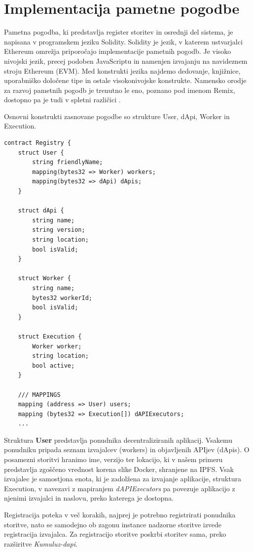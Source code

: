 \documentclass[a4paper, 12pt]{book}
\begin{document}
\section{Implementacija pametne pogodbe}
Pametna pogodba, ki predstavlja register storitev in osrednji del sistema, je napisana v programskem jeziku Solidity.
Solidity je jezik, v katerem ustvarjalci Ethereum omrežja priporočajo implementacije pametnih pogodb.
Je visoko nivojski jezik, precej podoben JavaScriptu in namenjen izvajanju na navideznem stroju Ethereum (EVM).
Med konstrukti jezika najdemo dedovanje, knjižnice, uporabniško določene tipe in ostale visokonivojske konstrukte.
Namensko orodje za razvoj pametnih pogodb je trenutno le eno, poznano pod imenom Remix, dostopno pa je tudi v spletni različici
\cite{solidityDocs}.

Osnovni konstrukti zasnovane pogodbe so strukture User, dApi, Worker in Execution.

\begin{lstlisting}
contract Registry {
	struct User {
		string friendlyName;
		mapping(bytes32 => Worker) workers;
		mapping(bytes32 => dApi) dApis;
	}
	
	struct dApi {
		string name;
		string version;
		string location;
		bool isValid;
	}
	
	struct Worker {
		string name;
		bytes32 workerId;
		bool isValid;
	}
	
	struct Execution {
		Worker worker;
		string location;
		bool active;
	}
	
 	/// MAPPINGS
	mapping (address => User) users;
	mapping (bytes32 => Execution[]) dAPIExecutors;
	...
\end{lstlisting}

Struktura \textbf{User} predstavlja ponudnika decentraliziranih aplikacij.
Vsakemu ponudniku pripada seznam izvajalcev (workers) in objavljenih APIjev (dApis).
O posamezni storitvi hranimo ime, verzijo ter lokacijo, ki v našem primeru predstavlja zgoščeno vrednost korena slike Docker, shranjene na IPFS.
Vsak izvajalec je samostjona enota, ki je zadolžena za izvajanje aplikacije, struktura Execution, v navezavi z mapiranjem \textit{dAPIExecutors} pa povezuje aplikacijo z njenimi izvajalci in naslovu, preko katerega je dostopna.

Registracija poteka v več korakih, najprej je potrebno registrirati ponudnika storitve, nato se samodejno ob zagonu instance nadzorne storitve izvede registracija izvajalca.
Za registracijo storitve poskrbi storitev sama, preko razširitve \textit{Kumuluz-dapi}.
\end{document}
